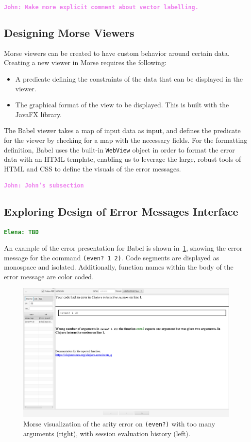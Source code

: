 \documentclass[12pt]{article}
\newcommand{\comment}[1]{{\bf \tt  {#1}}}
\newcommand{\emcomment}[1]{\textcolor{ForestGreen}{\comment{Elena: {#1}}}}
\newcommand{\jwcomment}[1]{\textcolor{violet}{\comment{John: {#1}}}}
\begin{document}
\jwcomment{Make more explicit comment about vector labelling.}


\subsection{Designing Morse Viewers}\label{subsec:Morse-Viewers}
Morse viewers can be created to have custom behavior around certain data.
Creating a new viewer in Morse requires the following:
\begin{itemize}
	\item A predicate defining the constraints of the data that can be displayed in the viewer.
	\item The graphical format of the view to be displayed. This is built with the JavaFX library. 
\end{itemize}
The Babel viewer takes a map of input data as input, and defines the predicate for the viewer by checking for a map with the necessary fields.
For the formatting definition, Babel uses the built-in \texttt{WebView} object in order to format the error data with an HTML template,
enabling us to leverage the large, robust tools of HTML and CSS to define the visuals of the error messages.

\jwcomment{John's subsection}

\subsection{Exploring Design of Error Messages Interface}\label{subsec:interface}
\emcomment{TBD}

An example of the error presentation for Babel is shown in~\ref{fig:babelview}, showing the error message for the command \texttt{(even? 1 2)}. 
Code segments are displayed as monospace and isolated. Additionally, function names within the body of the error message are color coded. 
\begin{figure}
	\centering
	\includegraphics[width=\linewidth]{resources/BabelViewerExample.png}
	\caption{Morse visualization of the arity error on \texttt{(even?)} with too many arguments (right), with session evaluation history (left).}
	\label{fig:babelview}
\end{figure}
\end{document}
